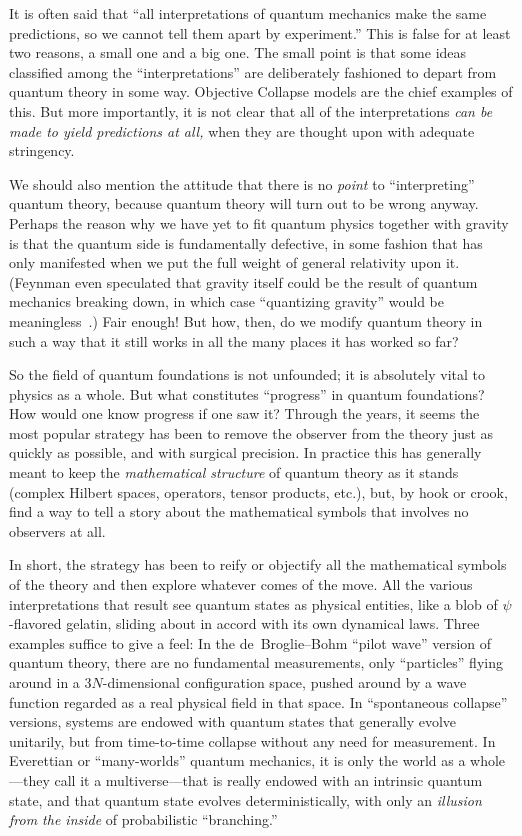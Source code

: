 \documentclass[aps,pra,superscriptaddress,12pt,tightenlines,nofootinbib]{revtex4-2}
\begin{document}
It is often said that ``all interpretations of quantum mechanics make the same predictions, so we cannot tell them apart by experiment.''  This is false for at least two reasons, a small one and a big one.  The small point is that some ideas classified among the ``interpretations'' are deliberately fashioned to depart from quantum theory in some way.  Objective Collapse models are the chief examples of this.  But more importantly, it is not clear that all of the interpretations {\it can be made to yield predictions at all,} when they are thought upon with adequate stringency.

We should also mention the attitude that there is no {\it point\/} to ``interpreting'' quantum theory, because quantum theory will turn out to be wrong anyway.  Perhaps the reason why we have yet to fit quantum physics together with gravity is that the quantum side is fundamentally defective, in some fashion that has only manifested when we put the full weight of general relativity upon it.  (Feynman even speculated that gravity itself could be the result of quantum mechanics breaking down, in which case ``quantizing gravity'' would be meaningless~\cite{Feynman03}.)  Fair enough!  But how, then, do we modify quantum theory in such a way that it still works in all the many places it has worked so far?

So the field of quantum foundations is not unfounded; it is absolutely vital to physics as a whole.  But what constitutes ``progress'' in quantum foundations?  How would one know progress if one saw it?  Through the years, it seems the most popular strategy has been to remove the observer from the theory just as quickly as possible, and with surgical precision.  In practice this has generally meant to keep the {\it mathematical structure\/} of quantum theory as it stands (complex Hilbert spaces, operators, tensor products, etc.), but, by hook or crook, find a way to tell a story about the mathematical symbols that involves no observers at all.

In short, the strategy has been to reify or objectify all the
mathematical symbols of the theory and then explore whatever comes of
the move.  All the various interpretations that result see quantum states
as physical entities, like a blob of $\psi$-flavored gelatin, sliding
about in accord with its own dynamical laws.
Three examples suffice to give a feel:  In the
de~Broglie--Bohm ``pilot wave'' version of quantum theory, there are
no fundamental measurements, only ``particles'' flying around in a
$3N$-dimensional configuration space, pushed around by a wave function
regarded as a real physical field in that space.  In ``spontaneous
collapse'' versions, systems are endowed with quantum states that
generally evolve unitarily, but from time-to-time collapse without any
need for measurement.  In Everettian or ``many-worlds'' quantum
mechanics, it is only the world as a whole---they call it a
multiverse---that is really endowed with an intrinsic quantum state,
and that quantum state evolves deterministically, with only an {\it
  illusion from the inside\/} of probabilistic ``branching.''
\end{document}
